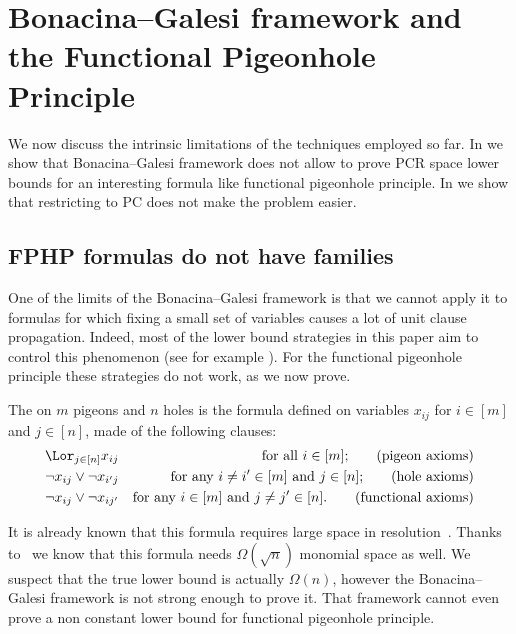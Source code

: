 \documentclass{toc}
\begin{document}
\section{Bonacina--Galesi framework and the Functional Pigeonhole Principle}
\label{sec:limitations}

  We now discuss the intrinsic limitations of the techniques employed
  so far. In  we show that
  Bonacina--Galesi framework does not allow to prove PCR space lower
  bounds for an interesting formula like functional pigeonhole
  principle. In  we show that
  restricting to PC does not make the problem easier.

\subsection{FPHP formulas do not have \KextendibleNok families}
\label{sec:fphp-no-kextendible}

One of the limits of the Bonacina--Galesi framework is that we cannot
apply it to formulas for which fixing a small set of variables causes
a lot of unit clause propagation. Indeed, most of the lower bound
strategies in this paper aim to control this phenomenon (see for
example ). For the functional pigeonhole
principle these strategies do not work, as we now prove.


\begin{definition}\label{def:fphpformula}
  The  on $m$ pigeons and $n$ holes is the formula defined on variables $x_{ij}$ for $i\in[m]$ and $j\in[n]$, made of the following clauses:
  \begin{align}
    \Lor_{j\in[n]} x_{ij} && \text{for all $i\in[m]$;} \tag{pigeon axioms}\\
    \lnot{x_{ij}} \lor \lnot{x_{i'j}} && \text{for any
      $i\not=i'\in[m]$ and $j\in[n]$;} \tag{hole axioms}\\
    \lnot{x_{ij}} \lor \lnot{x_{ij'}} && \text{for any $i\in[m]$ and
      $j\not=j'\in[n]$.\tag{functional axioms}}
  \end{align}
\end{definition}

%

%
%
%
%
%

It is already known that this formula requires large space in
resolution~\cite{BW01ShortProofs,AD08CombinatoricalCharacterization}.
%
Thanks to~\cite{GKT19SpaceWidth} we know that this formula needs
$\Omega(\sqrt{n})$ monomial space as well.
%
We suspect that the true lower bound is actually $\Omega(n)$, however
the Bonacina--Galesi framework is not strong enough to prove it.
That framework cannot even prove a non constant lower bound for
functional pigeonhole principle.
\end{document}

